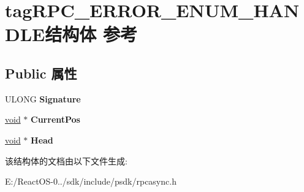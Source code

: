 \hypertarget{structtag_r_p_c___e_r_r_o_r___e_n_u_m___h_a_n_d_l_e}{}\section{tag\+R\+P\+C\+\_\+\+E\+R\+R\+O\+R\+\_\+\+E\+N\+U\+M\+\_\+\+H\+A\+N\+D\+L\+E结构体 参考}
\label{structtag_r_p_c___e_r_r_o_r___e_n_u_m___h_a_n_d_l_e}
\subsection*{Public 属性}
\begin{DoxyCompactItemize}
\item 
\mbox{\label{structtag_r_p_c___e_r_r_o_r___e_n_u_m___h_a_n_d_l_e_a293e3675c9035b26f4c19e15d0c5892e}} 
U\+L\+O\+NG {\bfseries Signature}
\item 
\mbox{\label{structtag_r_p_c___e_r_r_o_r___e_n_u_m___h_a_n_d_l_e_a8691a9bf89fa1f1312698fea468164a5}} 
\hyperlink{interfacevoid}{void} $\ast$ {\bfseries Current\+Pos}
\item 
\mbox{\label{structtag_r_p_c___e_r_r_o_r___e_n_u_m___h_a_n_d_l_e_a324f0dec45e4bef898b546fa34a77d48}} 
\hyperlink{interfacevoid}{void} $\ast$ {\bfseries Head}
\end{DoxyCompactItemize}


该结构体的文档由以下文件生成\+:\begin{DoxyCompactItemize}
\item 
E\+:/\+React\+O\+S-\/0../sdk/include/psdk/rpcasync.\+h\end{DoxyCompactItemize}
